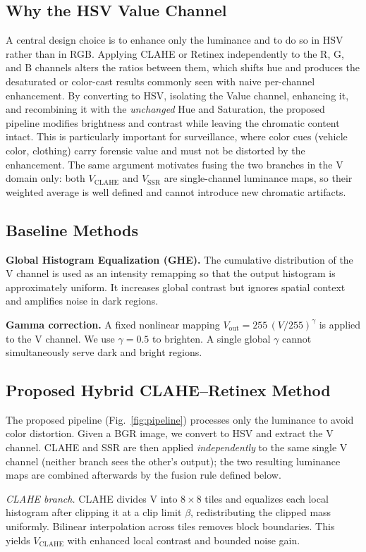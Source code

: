 \documentclass[conference,a4paper]{IEEEtran}
\begin{document}
\subsection{Why the HSV Value Channel}
A central design choice is to enhance only the luminance and to do so in HSV
rather than in RGB. Applying CLAHE or Retinex independently to the R, G, and B
channels alters the ratios between them, which shifts hue and produces the
desaturated or color-cast results commonly seen with naive per-channel
enhancement. By converting to HSV, isolating the Value channel, enhancing it,
and recombining it with the \emph{unchanged} Hue and Saturation, the proposed
pipeline modifies brightness and contrast while leaving the chromatic content
intact. This is particularly important for surveillance, where color cues
(vehicle color, clothing) carry forensic value and must not be distorted by the
enhancement. The same argument motivates fusing the two branches in the V
domain only: both $V_{\text{CLAHE}}$ and $V_{\text{SSR}}$ are single-channel
luminance maps, so their weighted average is well defined and cannot introduce
new chromatic artifacts.

\subsection{Baseline Methods}
\textbf{Global Histogram Equalization (GHE).} The cumulative distribution of the
V channel is used as an intensity remapping so that the output histogram is
approximately uniform. It increases global contrast but ignores spatial context
and amplifies noise in dark regions.

\textbf{Gamma correction.} A fixed nonlinear mapping
$V_{\text{out}} = 255\,(V/255)^{\gamma}$ is applied to the V channel. We use
$\gamma=0.5$ to brighten. A single global $\gamma$ cannot simultaneously serve
dark and bright regions.

\subsection{Proposed Hybrid CLAHE--Retinex Method}
The proposed pipeline (Fig.~\ref{fig:pipeline}) processes only the luminance to
avoid color distortion. Given a BGR image, we convert to HSV and extract the
V channel. CLAHE and SSR are then applied \emph{independently} to the same
single V channel (neither branch sees the other's output); the two resulting
luminance maps are combined afterwards by the fusion rule defined below.

\emph{CLAHE branch.} CLAHE divides V into $8\times8$ tiles and equalizes each
local histogram after clipping it at a clip limit $\beta$, redistributing the
clipped mass uniformly. Bilinear interpolation across tiles removes block
boundaries. This yields $V_{\text{CLAHE}}$ with enhanced local contrast and
bounded noise gain.
\end{document}
